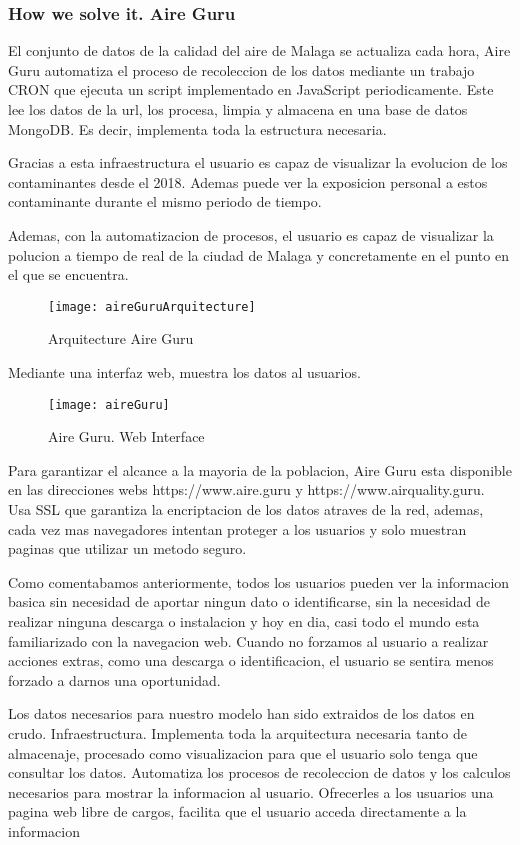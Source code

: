 \subsubsection{How we solve it. Aire Guru} 
El conjunto de datos de la calidad del aire de Malaga se actualiza cada hora, Aire Guru automatiza el proceso de recoleccion de los 
datos mediante un trabajo CRON que ejecuta un script implementado en JavaScript periodicamente. Este lee los datos de la url, los procesa,
limpia y almacena en una base de datos MongoDB. Es decir, implementa toda la estructura necesaria.

Gracias a esta infraestructura el usuario es capaz de visualizar la evolucion de los contaminantes desde el 2018. Ademas puede ver la exposicion
personal a estos contaminante durante el mismo periodo de tiempo.

Ademas, con la automatizacion de procesos, el usuario es capaz de visualizar la polucion a tiempo de real de la ciudad de Malaga y concretamente en el punto
en el que se encuentra.\\

\begin{figure}[ht]
    \centering
    \texttt{[image: aireGuruArquitecture]}
    \caption{Arquitecture Aire Guru}
\end{figure}

Mediante una interfaz web, muestra los datos al usuarios.\\

\begin{figure}[ht]
    \centering
    \texttt{[image: aireGuru]}
    \caption{Aire Guru. Web Interface}
\end{figure}

Para garantizar el alcance a la mayoria de la poblacion, Aire Guru esta disponible en las direcciones webs https://www.aire.guru y https://www.airquality.guru.
Usa SSL que garantiza la encriptacion de los datos atraves de la red, ademas, cada vez mas navegadores intentan proteger a los usuarios y
solo muestran paginas que utilizar un metodo seguro. 

Como comentabamos anteriormente, todos los usuarios pueden ver la informacion basica sin necesidad de aportar ningun dato o identificarse, sin la necesidad de 
realizar ninguna descarga o instalacion y hoy en dia, casi todo el mundo esta familiarizado con la navegacion web. 
Cuando no forzamos al usuario a realizar acciones extras, como una descarga o identificacion, el usuario se sentira menos forzado a darnos una oportunidad.

\begin{itemize}
\done Los datos necesarios para nuestro modelo han sido extraidos de los datos en crudo. 
\done Infraestructura. Implementa toda la arquitectura necesaria tanto de almacenaje, procesado como visualizacion para que el usuario solo tenga que consultar 
los datos.
\done Automatiza los procesos de recoleccion de datos y los calculos necesarios para mostrar la informacion al usuario. 
\done Ofrecerles a los usuarios una pagina web libre de cargos, facilita que el usuario acceda directamente a la informacion
\end{itemize}

